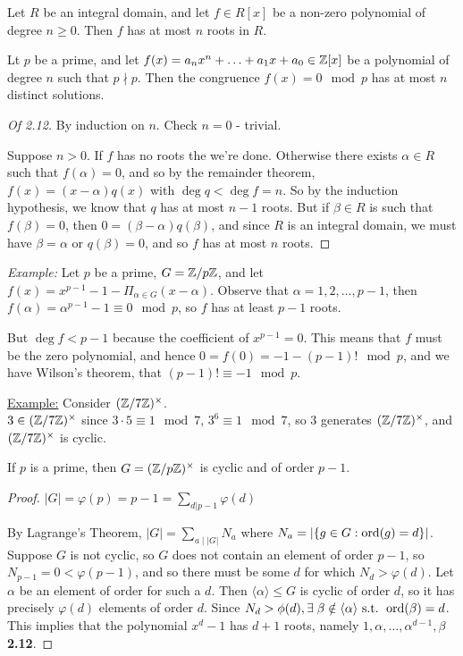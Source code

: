 \documentclass[10pt,a4paper]{article}
\begin{document}
\begin{theorem}
Let $R$ be an integral domain, and let $f\in R[x]$ be a non-zero polynomial of degree $n\geq 0$. Then $f$ has at most $n$ roots in $R$.
\end{theorem}
\begin{theorem}[Lagrange]
Lt $p$ be a prime, and let $f(x)=a_n x^n+\ldots + a_1 x + a_0 \in \mathbb{Z}[x]$ be a polynomial of degree $n$ such that $p\nmid p$. Then the congruence $f(x) = 0 \mod p$ has  at most $n$ distinct solutions.
\end{theorem}

\begin{proof}[Of 2.12]
By induction on $n$. Check $n=0$ - trivial.

Suppose $n>0$. If $f$ has no roots the we're done. Otherwise there exists $\alpha \in R$ such that $f(\alpha) = 0$, and so by the remainder theorem, $f(x) = (x-\alpha)q(x)$ with $\deg q < \deg f = n$. So by the induction hypothesis, we know that $q$ has at most $n-1$ roots. But if $\beta \in R$ is such that $f(\beta) = 0$, then $0 = (\beta-\alpha)q(\beta)$, and since $R$ is an integral domain, we must have $\beta = \alpha$ or $q(\beta) = 0$, and so $f$ has at most $n$ roots.
\end{proof}

\emph{Example:} Let $p$ be a prime, $G = \mathbb{Z}/p\mathbb{Z}$, and let $f(x) = x^{p-1} - 1 - \Pi_{\alpha \in G} (x-\alpha)$. Observe that $\alpha = 1,2, \ldots, p-1$, then $f(\alpha) = \alpha^{p-1} - 1 \equiv 0 \mod p$, so $f$ has at least $p-1$ roots.

But $\deg f < p-1$ because the coefficient of $x^{p-1} = 0$. This means that $f$ must be the zero polynomial, and hence $0 = f(0) = -1-(p-1)! \mod p$, and we have Wilson's theorem, that $(p-1)! \equiv -1 \mod p$.

\underline{Example:} Consider $(\mathbb{Z}/7\mathbb{Z})^\times$.\\
$3 \in (\mathbb{Z}/7\mathbb{Z})^\times$ since $3\cdot 5 \equiv 1 \mod 7$, $3^6 \equiv 1 \mod 7$, so $3$ generates $(\mathbb{Z}/7\mathbb{Z})^\times$, and $(\mathbb{Z}/7\mathbb{Z})^\times$ is cyclic.

\begin{theorem}
If $p$ is a prime, then $G = (\mathbb{Z}/p\mathbb{Z})^\times$ is cyclic and of order $p-1$.
\end{theorem}
\begin{proof}
$|G| = \varphi(p) = p-1 = \sum_{d|p-1} \varphi(d)$

By Lagrange's Theorem, $|G| = \sum_{a\mid |G|} N_a$ where $N_a = |\{g\in G : \operatorname{ord}(g)=d\}|$. Suppose $G$ is not cyclic, so $G$ does not contain an element of order $p-1$, so $N_{p-1} = 0 < \varphi(p-1)$, and so there must be some $d$ for which $N_d > \varphi(d)$. Let $\alpha$ be an element of order for such a $d$. Then $\langle\alpha\rangle \leq G$ is cyclic of order $d$, so it has precisely $\varphi(d)$ elements of order $d$. Since $N_d > \phi(d), \exists \beta \notin \langle\alpha\rangle \st \ord(\beta)=d$. This implies that the polynomial $x^d-1$ has $d+1$ roots, namely $1, \alpha,\ldots, \alpha^{d-1}, \beta$ \contr \textbf{2.12}.
\end{proof}
\end{document}
